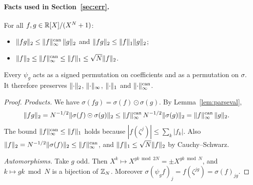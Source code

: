 \paragraph{Facts used in Section~\ref{sec:err}.}

\begin{lemma}\label{lem:norms}
For all $f,g\in\mathbb{R}[X]/(X^N+1)$:
\begin{itemize}[nosep]
  \item $\lVert fg\rVert_2\le\lVert f\rVert^{\mathrm{can}}_{\infty}\,\lVert g\rVert_2$ and $\lVert fg\rVert_2\le\lVert f\rVert_1\lVert g\rVert_2$;
  \item $\lVert f\rVert_2\le\lVert f\rVert^{\mathrm{can}}_{\infty}\le\lVert f\rVert_1\le\sqrt N\lVert f\rVert_2$.
\end{itemize}
Every $\psi_g$ acts as a signed permutation on coefficients and as a permutation on $\sigma$. It therefore preserves $\lVert \cdot\rVert_2$, $\lVert \cdot\rVert_\infty$, $\lVert \cdot\rVert_1$ and $\lVert \cdot\rVert^{\mathrm{can}}_{\infty}$.
\end{lemma}
\begin{proof}
\emph{Products.} We have $\sigma(fg)=\sigma(f)\odot\sigma(g)$. By Lemma~\ref{lem:parseval},
\[
  \lVert fg\rVert_2=N^{-1/2}\lVert \sigma(f)\odot\sigma(g)\rVert_2\le\lVert f\rVert^{\mathrm{can}}_{\infty}\,N^{-1/2}\lVert \sigma(g)\rVert_2=\lVert f\rVert^{\mathrm{can}}_{\infty}\,\lVert g\rVert_2 .
\]
The bound $\lVert f\rVert^{\mathrm{can}}_{\infty}\le\lVert f\rVert_1$ holds because $|f(\zeta^j)|\le\sum_k|f_k|$. Also $\lVert f\rVert_2=N^{-1/2}\lVert \sigma(f)\rVert_2\le\lVert f\rVert^{\mathrm{can}}_{\infty}$, and $\lVert f\rVert_1\le\sqrt N\lVert f\rVert_2$ by Cauchy--Schwarz.

\emph{Automorphisms.} Take $g$ odd. Then $X^{k}\mapsto X^{gk\bmod2N}=\pm X^{gk\bmod N}$, and $k\mapsto gk\bmod N$ is a bijection of $\mathbb{Z}_N$. Moreover $\sigma(\psi_gf)_j=f(\zeta^{jg})=\sigma(f)_{jg}$.
\end{proof}


